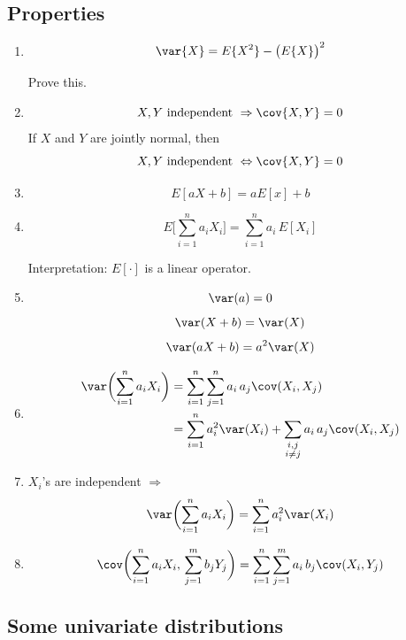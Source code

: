 \documentclass[12pt]{article}
\begin{document}
\subsection{Properties}

\begin{enumerate}
\item
    \[ \var\{X\} = E\{X^2\} - \bigl(E\{X\}\bigr)^2 \]

\exercise Prove this.

\item
    \[ X, Y \text{ independent } \Rightarrow \cov\{X,Y\} = 0 \]
    If $X$ and $Y$ are jointly normal, then
    \[ X, Y \text{ independent } \Leftrightarrow \cov\{X,Y\} = 0\]
\item
    \[ E[aX + b] = aE[x] + b \]
\item
    \[ E\biggl[ \sum_{i=1}^n a_i X_i \biggr]
        = \sum_{i=1}^n a_i\, E[X_i] \]

    Interpretation: $E[\cdot]$ is a linear operator.
\item
    \[ \var(a) = 0 \]
    \[ \var(X + b) = \var(X) \]
    \[ \var(aX + b) = a^2\var(X) \]

\item
    \[ \begin{split}
    \var\biggl( \sum_{i=1}^n a_i X_i \biggr)
        &= \sum_{i=1}^n \sum_{j=1}^n a_i\, a_j \cov(X_i, X_j) \\
        &= \sum_{i=1}^n a_i^2 \var(X_i)
            + \sum_{\substack{i, j\\i\ne j}}
                a_i\, a_j \cov(X_i, X_j)
    \end{split}
    \]
\item $X_i$'s are independent $\Rightarrow$
    \[ \var\biggl( \sum_{i=1}^n a_i X_i \biggr)
        = \sum_{i=1}^n a_i^2 \var(X_i)
    \]
\item
    \[
    \cov\biggl( \sum_{i=1}^n a_i X_i,\, \sum_{j=1}^m b_j Y_j \biggr)
        = \sum_{i=1}^n \sum_{j=1}^m a_i\, b_j \cov(X_i, Y_j)
    \]
\end{enumerate}

\subsection{Some univariate distributions}

\subsubsection{}
\end{document}
